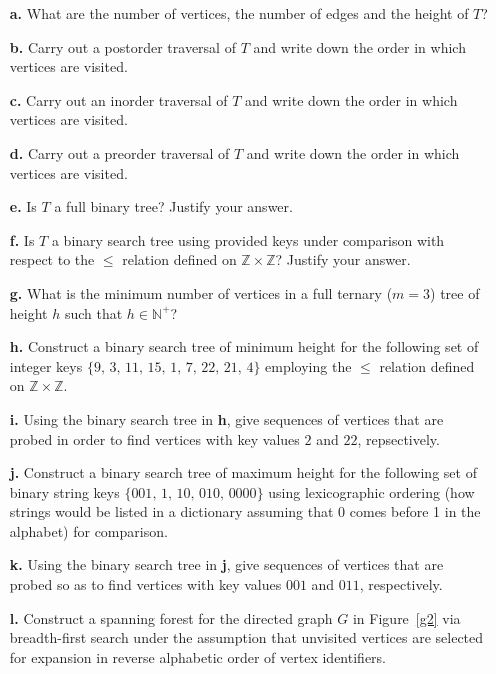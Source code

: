 \documentclass[11pt]{article}
\begin{document}
\begin{itemize}
	\item[\textbf{a.}] What are the number of vertices, the number of edges and the height of $T$? \hfill \normalfont{(1 pt)} 
	\item[\textbf{b.}] Carry out a postorder traversal of $T$ and write down the order in which vertices are visited. \hfill \normalfont{(1 pt)}
	\item[\textbf{c.}] Carry out an inorder traversal of $T$ and write down the order in which vertices are visited. \hfill \normalfont{(1 pt)}
	\item[\textbf{d.}] Carry out a preorder traversal of $T$ and write down the order in which vertices are visited. \hfill \normalfont{(1 pt)}
	\item[\textbf{e.}] Is $T$ a full binary tree? Justify your answer. \hfill \normalfont{(1 pt)}
	\item[\textbf{f.}] Is $T$ a binary search tree using provided keys under comparison with respect to the $\leq$ relation defined on $\mathbb{Z}\times\mathbb{Z}$? Justify your answer. \hfill \normalfont{(1 pt)}
	\item[\textbf{g.}] What is the minimum number of vertices in a full ternary ($m=3$) tree of height $h$ such that $h\in\mathbb{N}^+$? \hfill \normalfont{(1 pt)}
	\item[\textbf{h.}] Construct a binary search tree of minimum height for the following set of integer keys $\{9,\, 3, \,11,\, 15,\, 1,\, 7,\, 22,\, 21,\, 4\}$ employing the $\leq$ relation defined on $\mathbb{Z}\times\mathbb{Z}$. \hfill {}
	\item[\textbf{i.}] Using the binary search tree in \textbf{h}, give sequences of vertices that are probed in order to find vertices with key values $2$ and $22$, repsectively. \hfill \normalfont{(1 pt)}
	\item[\textbf{j.}] Construct a binary search tree of maximum height for the following set of binary string keys $\{001,\, 1, \,10,\, 010,\, 0000\}$ using lexicographic ordering (how strings would be listed in a dictionary assuming that 0 comes before 1 in the alphabet) for comparison. \hfill {}
	\item[\textbf{k.}] Using the binary search tree in \textbf{j}, give sequences of vertices that are probed so as to find vertices with key values $001$ and $011$, respectively. \hfill \normalfont{(1 pt)}
	\item[\textbf{l.}] Construct a spanning forest for the directed graph $G$ in Figure~\ref{g2} via breadth-first search under the assumption that unvisited vertices are selected for expansion in reverse alphabetic order of vertex identifiers. \hfill {}
\end{itemize}
\end{document}
